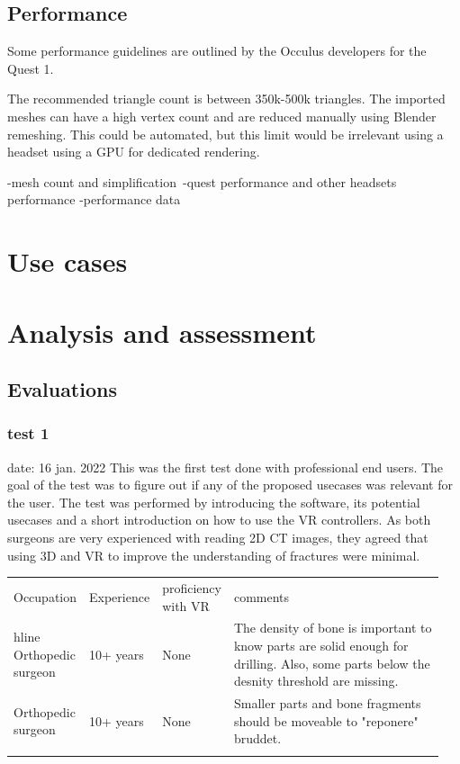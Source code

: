 \documentclass[a4paper]{report}
\begin{document}
\section{Performance}
Some performance guidelines are outlined by the Occulus developers for the Quest 1\cite{performance}.

The recommended triangle count is between 350k-500k triangles. The imported meshes can have a high vertex count and are reduced manually using Blender remeshing.
This could be automated, but this limit would be irrelevant using a headset using a GPU for dedicated rendering.


-mesh count and simplification\
-quest performance and other headsets performance
-performance data

\chapter{Use cases}\label{usecases}

\chapter{Analysis and assessment}\label{analysis and assessment}


\section{Evaluations}


\subsection{test 1}
date: 16 jan. 2022
This was the first test done with professional end users. The goal of the test was to figure out if any of the proposed usecases was relevant for the user. The test was performed by introducing the software, its potential usecases and a short introduction on how to use the VR controllers.
As both surgeons are very experienced with reading 2D CT images, they agreed that using 3D and VR to improve the understanding of fractures were minimal.

\begin{table}[ht]
\begin{tabular}{p{0.15\linewidth} |p{0.15\linewidth} |p{0.15\linewidth} | p{0.5\linewidth}}
Occupation         & Experience & proficiency with VR & comments                                                                                                                                \\hline
Orthopedic surgeon & 10+ years  & None                & The density of bone is important to know parts are solid enough for drilling. Also, some parts below the desnity threshold are missing. \\
Orthopedic surgeon & 10+ years  & None                & Smaller parts and bone fragments should be moveable to "reponere" bruddet.                                                              \\
                   &            &                     &
\end{tabular}
\end{table}
\end{document}
